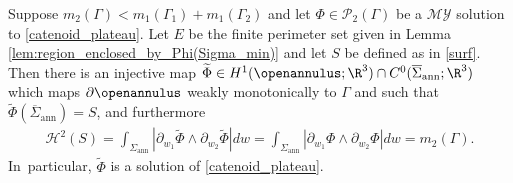 \begin{lemma}\label{lem:construction-of-parametrization}
Suppose $m_2(\Gamma)<m_1(\Gamma_1)+m_1(\Gamma_2)$ and let $\Phi\in\mathcal{P}_2(\Gamma)$ be a $\mathcal{MY}$ solution to \eqref{catenoid_plateau}. Let $E$ be the finite perimeter set given in Lemma \ref{lem:region_enclosed_by_Phi(Sigma_min)} and let
$S$ be defined as in \eqref{surf}.
Then there is an injective map $\widetilde\Phi\in H^1
(\openannulus;\R^3)\cap C^0(\overline \Sigma_\mathrm{ann};\R^3)$
which maps $\partial \openannulus$
weakly monotonically to $\Gamma$ and such that $\widetilde\Phi (\overline \Sigma_\mathrm{ann}) =S$, and
furthermore
\begin{align}\label{eq:area-symmetrization}
\mathcal H^2(S)= \int_{\Sigma_{\mathrm{ann}}}|\partial_{w_1}\widetilde \Phi\wedge \partial_{w_2}\widetilde \Phi |dw=
\int_{\Sigma_{\mathrm{ann}}}|\partial_{w_1}\Phi\wedge\partial_{w_2}\Phi|dw=m_2(\Gamma).
\end{align}
In~particular, $\widetilde \Phi$ is a solution of \eqref{catenoid_plateau}.
\end{lemma}

